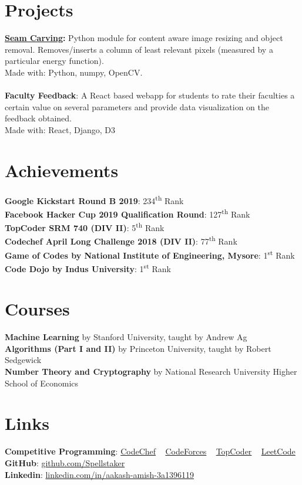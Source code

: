 \documentclass[margin, centered]{res}
\begin{document}
\begin{resume}
		\section{Projects}
			\textbf{\href{https://github.com/Spellstaker/Seam-Carving}{Seam Carving}:}
			Python module for content aware image resizing and object removal.
			Removes/inserts a column of least relevant pixels (measured by a particular energy function).\\
			Made with: Python, numpy, OpenCV.
			\\ \\
			\textbf{Faculty Feedback}:
			A React based webapp for students to rate their faculties a certain value on several parameters
			and provide data visualization on the feedback obtained.\\
			Made with: React, Django, D3
		
		\section{Achievements}
			\textbf{Google Kickstart Round B 2019}: 234\textsuperscript{th} Rank\\
			\textbf{Facebook Hacker Cup 2019 Qualification Round}: 127\textsuperscript{th} Rank\\
			\textbf{TopCoder SRM 740 (DIV II)}: 5\textsuperscript{th} Rank\\
			\textbf{Codechef April Long Challenge 2018 (DIV II)}: 77\textsuperscript{th} Rank\\
			\textbf{Game of Codes by National Institute of Engineering, Mysore}: 1\textsuperscript{st} Rank\\
			\textbf{Code Dojo by Indus University}: 1\textsuperscript{st} Rank
		
		\section{Courses}
			\textbf{Machine Learning} by Stanford University, taught by Andrew Ag\\
			\textbf{Algorithms (Part I and II)} by Princeton University, taught by Robert Sedgewick\\
			\textbf{Number Theory and Cryptography} by National Research University Higher School of Economics 
		
		\section{Links}
			\textbf{Competitive Programming}:
			\href{https://www.codechef.com/users/spellstaker}{CodeChef}
			~
			\href{https://codeforces.com/profile/spellstaker}{CodeForces}
			~
			\href{https://topcoder.com/members/spellstaker/}{TopCoder}
			~
			\href{https://leetcode.com/spellstaker/}{LeetCode}
			\\
			\textbf{GitHub}: \href{https://github.com/Spellstaker}{github.com/Spellstaker}
			\\
			\textbf{Linkedin}: \href{https://www.linkedin.com/in/aakash-amish-3a1396119/}{linkedin.com/in/aakash-amish-3a1396119}
	\end{resume}
\end{document}
